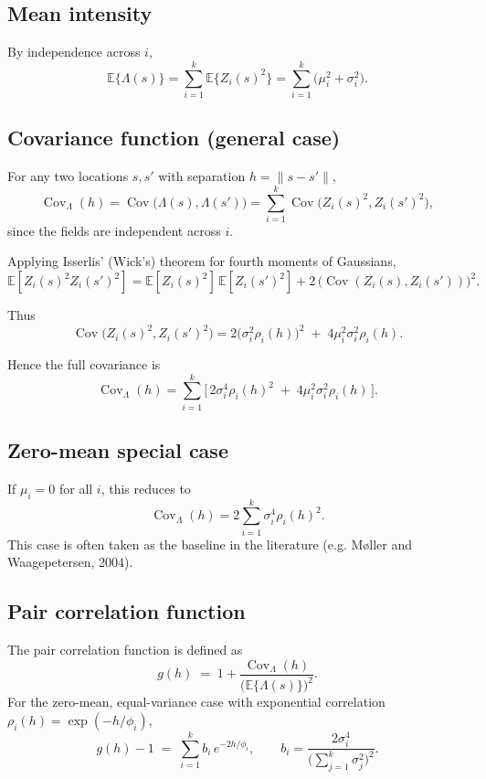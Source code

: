 \documentclass[11pt]{article}
\begin{document}
\subsection{Mean intensity}
By independence across $i$,
\[
\mathbb{E}\{\Lambda(s)\}
= \sum_{i=1}^k \mathbb{E}\{Z_i(s)^2\}
= \sum_{i=1}^k \big(\mu_i^2 + \sigma_i^2\big).
\]

\subsection{Covariance function (general case)}
For any two locations $s,s'$ with separation $h=\|s-s'\|$,
\[
\operatorname{Cov}_\Lambda(h) 
= \operatorname{Cov}\!\big(\Lambda(s), \Lambda(s')\big)
= \sum_{i=1}^k \operatorname{Cov}\!\big(Z_i(s)^2, Z_i(s')^2\big),
\]
since the fields are independent across $i$.

Applying Isserlis’ (Wick’s) theorem for fourth moments of Gaussians,
\[
\mathbb{E}[Z_i(s)^2 Z_i(s')^2]
= \mathbb{E}[Z_i(s)^2]\,\mathbb{E}[Z_i(s')^2]
+ 2\,\big(\operatorname{Cov}(Z_i(s),Z_i(s'))\big)^2.
\]

Thus
\[
\operatorname{Cov}\!\big(Z_i(s)^2,Z_i(s')^2\big)
= 2 \big(\sigma_i^2 \rho_i(h)\big)^2 \;+\; 4 \mu_i^2 \sigma_i^2 \rho_i(h).
\]

Hence the full covariance is
\[
\boxed{\;
	\operatorname{Cov}_\Lambda(h) 
	= \sum_{i=1}^k \Big[\,2 \sigma_i^4 \rho_i(h)^2 \;+\; 4 \mu_i^2 \sigma_i^2 \rho_i(h)\,\Big].
	\;}
\]

\subsection{Zero-mean special case}
If $\mu_i=0$ for all $i$, this reduces to
\[
\boxed{\;\;
	\operatorname{Cov}_\Lambda(h) = 2 \sum_{i=1}^k \sigma_i^4 \rho_i(h)^2 .
	\;\;}
\]
This case is often taken as the baseline in the literature (e.g. Møller and Waagepetersen, 2004).

\subsection{Pair correlation function}
The pair correlation function is defined as
\[
g(h) \;=\; 1 + \frac{\operatorname{Cov}_\Lambda(h)}{ \big(\mathbb{E}\{\Lambda(s)\}\big)^2 }.
\]
For the zero-mean, equal-variance case with exponential correlation $\rho_i(h) = \exp(-h/\phi_i)$, 
\[
g(h)-1 \;=\; \sum_{i=1}^k b_i \, e^{-2h/\phi_i},
\qquad 
b_i = \frac{2\sigma_i^4}{\Big(\sum_{j=1}^k \sigma_j^2\Big)^2}.
\]
\end{document}
